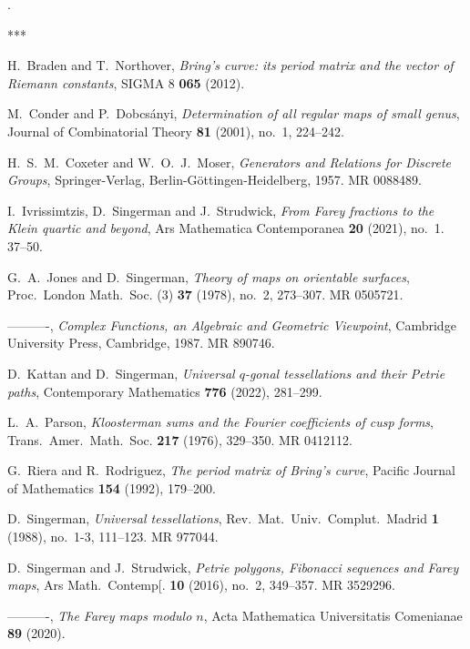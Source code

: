 \documentclass{amsproc}
\numberwithin{equation}{section}
\numberwithin{equation}{section}
\theoremstyle{definition}
\theoremstyle{remark}
\numberwithin{equation}{section}
\begin{document}
.

\begin{thebibliography}{***}

 H.~Braden and T.~Northover, {\em Bring's curve: its period matrix and the vector of Riemann constants}, SIGMA 8 {\bf 065} (2012).

 M.~Conder and P.~Dobcs\'anyi, {\em Determination of all regular maps of small genus}, Journal of Combinatorial Theory {\bf 81} (2001), no.~1, 224--242.

 H.~S.~M.~Coxeter and W.~O.~J.~Moser, {\em Generators and Relations for Discrete Groups}, Springer-Verlag, Berlin-G\"ottingen-Heidelberg, 1957. MR 0088489.

 I.~Ivrissimtzis, D.~Singerman and J.~Strudwick, {\em From Farey fractions to the Klein quartic and beyond}, Ars Mathematica Contemporanea {\bf 20} (2021), no.~1. 37--50.

 G.~A.~Jones and D.~Singerman, {\em Theory of maps on orientable surfaces}, Proc.~London Math.~Soc. (3) {\bf 37} (1978), no.~2, 273--307. MR 0505721.

 ----------, {\em Complex Functions, an Algebraic and Geometric Viewpoint}, Cambridge University Press, Cambridge, 1987. MR 890746.

 D.~Kattan and D.~Singerman, {\em Universal $q$-gonal tessellations and their Petrie paths}, Contemporary Mathematics {\bf 776} (2022), 281--299.

 L.~A.~Parson, {\em Kloosterman sums and the Fourier coefficients of cusp forms}, Trans.~Amer.~Math.~Soc. {\bf 217} (1976), 329--350. MR 0412112.

 G.~Riera and R.~Rodriguez, {\em The period matrix of Bring's curve}, Pacific Journal of Mathematics {\bf 154} (1992), 179--200.

 D.~Singerman, {\em Universal tessellations}, Rev.~Mat.~Univ.~Complut.~Madrid {\bf 1} (1988), no.~1-3, 111--123. MR 977044.

 D.~Singerman and J.~Strudwick, {\em Petrie polygons, Fibonacci sequences and Farey maps}, Ars Math.~Contemp[. {\bf 10} (2016), no.~2, 349--357. MR 3529296.

 ----------, {\em The Farey maps modulo $n$}, Acta Mathematica Universitatis Comenianae {\bf 89} (2020).


\end{thebibliography}
\end{document}
